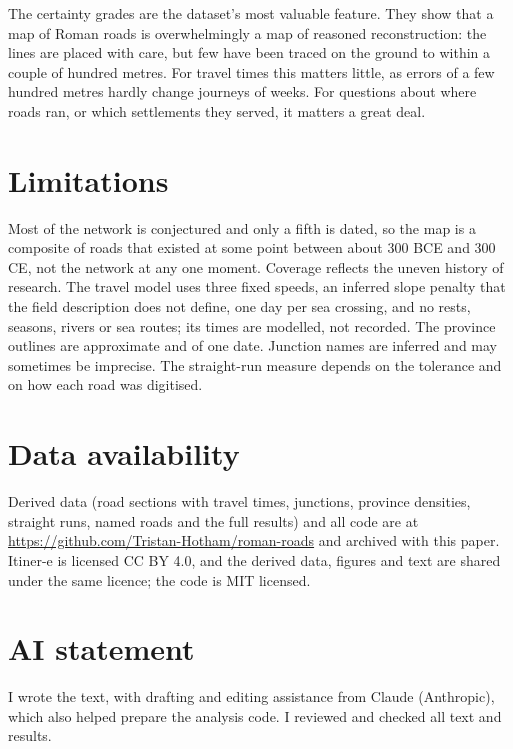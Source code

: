 \documentclass[11pt,a4paper]{article}
\begin{document}
The certainty grades are the dataset's most valuable feature. They show that a map of Roman roads is overwhelmingly a map of reasoned reconstruction: the lines are placed with care, but few have been traced on the ground to within a couple of hundred metres. For travel times this matters little, as errors of a few hundred metres hardly change journeys of weeks. For questions about where roads ran, or which settlements they served, it matters a great deal.

\section{Limitations}
Most of the network is conjectured and only a fifth is dated, so the map is a composite of roads that existed at some point between about 300 BCE and 300 CE, not the network at any one moment. Coverage reflects the uneven history of research. The travel model uses three fixed speeds, an inferred slope penalty that the field description does not define, one day per sea crossing, and no rests, seasons, rivers or sea routes; its times are modelled, not recorded. The province outlines are approximate and of one date. Junction names are inferred and may sometimes be imprecise. The straight-run measure depends on the tolerance and on how each road was digitised.

\section*{Data availability}
Derived data (road sections with travel times, junctions, province densities, straight runs, named roads and the full results) and all code are at \url{https://github.com/Tristan-Hotham/roman-roads} and archived with this paper. Itiner-e is licensed CC BY 4.0, and the derived data, figures and text are shared under the same licence; the code is MIT licensed.

\section*{AI statement}
I wrote the text, with drafting and editing assistance from Claude (Anthropic), which also helped prepare the analysis code. I reviewed and checked all text and results.
\end{document}

